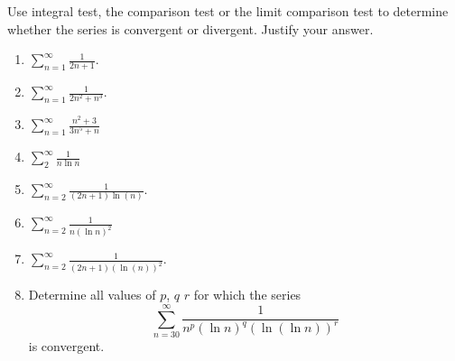 Use integral test, the comparison test or the limit comparison test to determine whether the series is convergent or divergent. Justify your answer.
\begin{multicols}{2}
\begin{enumerate}[ref={\fcProblemRef}]
\item 
$\displaystyle \sum\limits_{n=1}^{\infty} \frac{1}{2n+1}$.

\item 
$\displaystyle \sum\limits_{n=1}^{\infty} \frac{1}{2n^2+n^3}$.

\item $\displaystyle \sum\limits_{n=1}^{\infty}\frac{n^2+3}{3n^5+n}$

\item \label{problemConvergencesum_2^infty1/(xlnx)dx}
$\displaystyle \sum_{2}^\infty \frac{1}{n \ln n}$

\item  \label{problemConvergencesum_2^infty1/((2n+1)ln(n)}
$\displaystyle \sum\limits_{n=2}^{\infty} \frac{1}{(2n+1)\ln (n)}$.

\item $\displaystyle \sum\limits_{n=2}^{\infty}\frac{1}{n(\ln n)^2}$

\item 
$\displaystyle \sum\limits_{n=2}^{\infty} \frac{1}{(2n+1)(\ln (n))^2}$.

\item 
Determine all values of $p$, $q$ $r$ for which the series 
\[
\displaystyle \sum_{n=30}^{\infty} \frac{1}{n^p(\ln n)^q(\ln (\ln n))^r}
\]
is convergent.


\end{enumerate}
\end{multicols}

